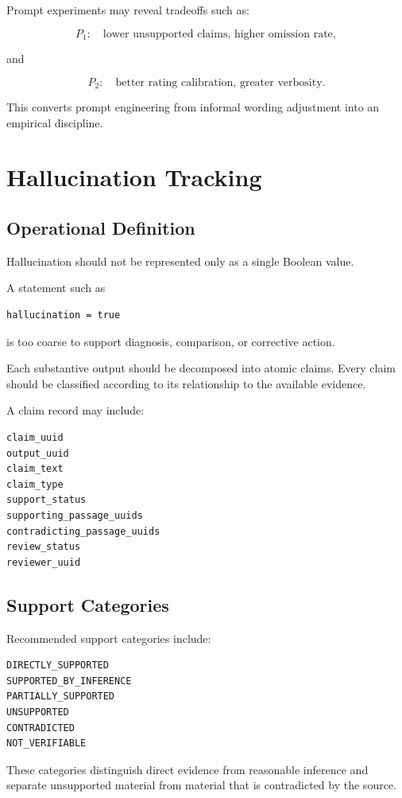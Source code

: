 \documentclass[11pt]{report}
\begin{document}
Prompt experiments may reveal tradeoffs such as:

\[
P_1:
\quad
\text{lower unsupported claims, higher omission rate},
\]

and

\[
P_2:
\quad
\text{better rating calibration, greater verbosity}.
\]

This converts prompt engineering from informal wording adjustment into an empirical discipline.

\chapter{Hallucination Tracking}

\section{Operational Definition}

Hallucination should not be represented only as a single Boolean value.

A statement such as

\begin{verbatim}
hallucination = true
\end{verbatim}

is too coarse to support diagnosis, comparison, or corrective action.

Each substantive output should be decomposed into atomic claims. Every claim should be classified according to its relationship to the available evidence.

A claim record may include:

\begin{verbatim}
claim_uuid
output_uuid
claim_text
claim_type
support_status
supporting_passage_uuids
contradicting_passage_uuids
review_status
reviewer_uuid
\end{verbatim}

\section{Support Categories}

Recommended support categories include:

\begin{verbatim}
DIRECTLY_SUPPORTED
SUPPORTED_BY_INFERENCE
PARTIALLY_SUPPORTED
UNSUPPORTED
CONTRADICTED
NOT_VERIFIABLE
\end{verbatim}

These categories distinguish direct evidence from reasonable inference and separate unsupported material from material that is contradicted by the source.
\end{document}
